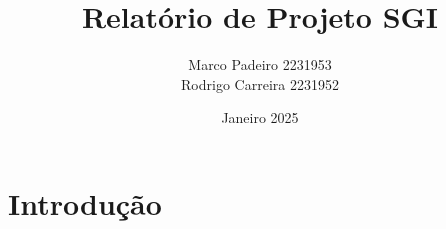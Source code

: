 \documentclass{report}
\title{Relatório de Projeto SGI}
\author{Marco Padeiro 2231953\\Rodrigo Carreira 2231952}
\date{Janeiro 2025}
\begin{document}
\maketitle

\section{Introdução}
\end{document}
